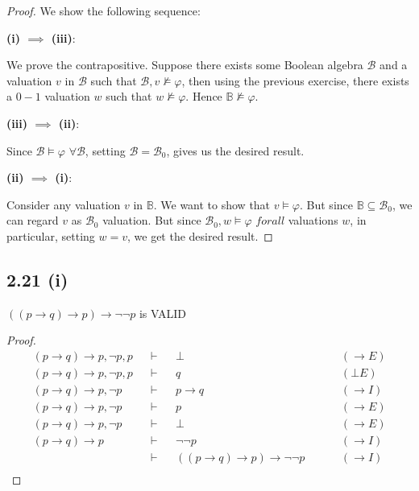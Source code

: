 \documentclass[12pt]{article}
\begin{document}
\begin{proof}
We show the following sequence:

\textbf{(i) $\implies$ (iii)}:

We prove the contrapositive. Suppose there exists some Boolean algebra $\mathcal{B}$ and a valuation $v$ in $\mathcal{B}$ such that $\mathcal{B}, v \not \models \varphi$, then using the previous exercise, there exists a $0-1$ valuation $w$ such that $w \not \models \varphi$. Hence $\mathbb{B} \not \models \varphi$.

\textbf{(iii) $\implies$ (ii)}:

Since $\mathcal{B} \models \varphi$ $\forall \mathcal{B}$, setting $\mathcal{B} = \mathcal{B}_0$, gives us the desired result.

\textbf{(ii) $\implies$ (i)}:

Consider any valuation $v$ in $\mathbb{B}$. We want to show that $v \models \varphi$. But since $\mathbb{B} \subseteq \mathcal{B}_0$, we can regard $v$ as $\mathcal{B}_0$ valuation. But since $\mathcal{B}_0,w \models \varphi$ $forall$ valuations $w$, in particular, setting $w=v$, we get the desired result.

\end{proof}

\subsection*{2.21 (i)} 
$((p \rightarrow q) \rightarrow p) \rightarrow \neg \neg p$ is VALID

\begin{proof}
\begin{align*}
    (p \rightarrow q) \rightarrow p, \neg p, p &&\vdash&& \bot && &&(\rightarrow E) \\
    (p \rightarrow q) \rightarrow p, \neg p, p &&\vdash&& q && &&(\bot E)\\
    (p \rightarrow q) \rightarrow p, \neg p &&\vdash&& p \rightarrow q && &&(\rightarrow I)\\
    (p \rightarrow q) \rightarrow p, \neg p &&\vdash&& p && &&(\rightarrow E)\\
    (p \rightarrow q) \rightarrow p, \neg p &&\vdash&& \bot && &&(\rightarrow E)\\
    (p \rightarrow q) \rightarrow p &&\vdash&& \neg \neg p && &&(\rightarrow I)\\
    &&\vdash&& ((p \rightarrow q) \rightarrow p) \rightarrow \neg \neg p && &&(\rightarrow I)\\
\end{align*}
\end{proof}
\end{document}
